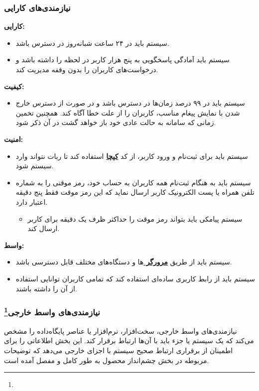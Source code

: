 \documentclass[12pt]{article}
\begin{document}
	\subsubsection{نیازمندی‌های کارایی}

	\textbf{کارایی:}
	\begin{itemize}
		\item
		سیستم باید در ۲۴ ساعت شبانه‌روز در دسترس باشد.
		\item
		سیستم باید آمادگی پاسخگویی به پنج هزار کاربر در لحظه را داشته باشد و درخواست‌های کاربران را بدون وقفه مدیریت کند.
	\end{itemize}

	\textbf{کیفیت:}
	\begin{itemize}
		\item
		سیستم باید در ۹۹ درصد زمان‌ها در دسترس باشد و در صورت از دسترس خارج شدن با نمایش پیغام مناسب، کاربران را از علت خطا آگاه کند. همچنین تخمین زمانی که سامانه به حالت عادی خود باز خواهد گشت در آن ذکر شود.
	\end{itemize}

	\textbf{امنیت:}
	\begin{itemize}
		\item
		سیستم باید برای ثبت‌نام و ورود کاربر، از کد \textbf{\hyperref[ref:captcha]{کپچا}} استفاده کند تا ربات نتواند وارد سیستم شود.
		\item
		سیستم باید به هنگام ثبت‌نام همه کاربران به حساب خود، رمز موقتی را به شماره تلفن همراه یا پست الکترونیک کاربر ارسال نماید که این رمز موقت فقط پنج دقیقه اعتبار دارد.
		\begin{itemize}
			\item
			سیستم پیامکی باید بتواند رمز موقت را حداکثر ظرف یک دقیقه برای کاربر ارسال کند.
		\end{itemize}
	\end{itemize}

	\textbf{واسط:}
	\begin{itemize}
		\item
		سیستم باید از طریق \textbf{\hyperref[ref:browser]{مرورگر }}ها و دستگاه‌های مختلف قابل دسترسی باشد.
		\item
		سیستم باید از رابط کاربری ساده‌ای استفاده کند که تمامی کاربران توانایی استفاده از آن را داشته باشند.
	\end{itemize}

	\subsubsection{نیازمندی‌های واسط خارجی\footnote{}}
	نیازمندی‌های واسط خارجی، سخت‌افزار، نرم‌افزار یا عناصر پایگاه‌داده را مشخص می‌کند که یک سیستم یا جزء باید با آن‌ها ارتباط برقرار کند. این بخش اطلاعاتی را برای اطمینان از برقراری ارتباط صحیح سیستم با اجزای خارجی می‌دهد که توضیحات مربوطه در بخش چشم‌انداز محصول به طور کامل و مفصل آمده است.
\end{document}
